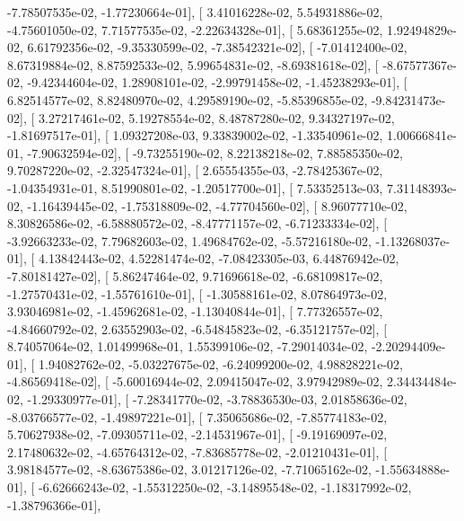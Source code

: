 \documentclass{article}
\begin{document}
         -7.78507535e-02,  -1.77230664e-01],
       [  3.41016228e-02,   5.54931886e-02,  -4.75601050e-02,
          7.71577535e-02,  -2.22634328e-01],
       [  5.68361255e-02,   1.92494829e-02,   6.61792356e-02,
         -9.35330599e-02,  -7.38542321e-02],
       [ -7.01412400e-02,   8.67319884e-02,   8.87592533e-02,
          5.99654831e-02,  -8.69381618e-02],
       [ -8.67577367e-02,  -9.42344604e-02,   1.28908101e-02,
         -2.99791458e-02,  -1.45238293e-01],
       [  6.82514577e-02,   8.82480970e-02,   4.29589190e-02,
         -5.85396855e-02,  -9.84231473e-02],
       [  3.27217461e-02,   5.19278554e-02,   8.48787280e-02,
          9.34327197e-02,  -1.81697517e-01],
       [  1.09327208e-03,   9.33839002e-02,  -1.33540961e-02,
          1.00666841e-01,  -7.90632594e-02],
       [ -9.73255190e-02,   8.22138218e-02,   7.88585350e-02,
          9.70287220e-02,  -2.32547324e-01],
       [  2.65554355e-03,  -2.78425367e-02,  -1.04354931e-01,
          8.51990801e-02,  -1.20517700e-01],
       [  7.53352513e-03,   7.31148393e-02,  -1.16439445e-02,
         -1.75318809e-02,  -4.77704560e-02],
       [  8.96077710e-02,   8.30826586e-02,  -6.58880572e-02,
         -8.47771157e-02,  -6.71233334e-02],
       [ -3.92663233e-02,   7.79682603e-02,   1.49684762e-02,
         -5.57216180e-02,  -1.13268037e-01],
       [  4.13842443e-02,   4.52281474e-02,  -7.08423305e-03,
          6.44876942e-02,  -7.80181427e-02],
       [  5.86247464e-02,   9.71696618e-02,  -6.68109817e-02,
         -1.27570431e-02,  -1.55761610e-01],
       [ -1.30588161e-02,   8.07864973e-02,   3.93046981e-02,
         -1.45962681e-02,  -1.13040844e-01],
       [  7.77326557e-02,  -4.84660792e-02,   2.63552903e-02,
         -6.54845823e-02,  -6.35121757e-02],
       [  8.74057064e-02,   1.01499968e-01,   1.55399106e-02,
         -7.29014034e-02,  -2.20294409e-01],
       [  1.94082762e-02,  -5.03227675e-02,  -6.24099200e-02,
          4.98828221e-02,  -4.86569418e-02],
       [ -5.60016944e-02,   2.09415047e-02,   3.97942989e-02,
          2.34434484e-02,  -1.29330977e-01],
       [ -7.28341770e-02,  -3.78836530e-03,   2.01858636e-02,
         -8.03766577e-02,  -1.49897221e-01],
       [  7.35065686e-02,  -7.85774183e-02,   5.70627938e-02,
         -7.09305711e-02,  -2.14531967e-01],
       [ -9.19169097e-02,   2.17480632e-02,  -4.65764312e-02,
         -7.83685778e-02,  -2.01210431e-01],
       [  3.98184577e-02,  -8.63675386e-02,   3.01217126e-02,
         -7.71065162e-02,  -1.55634888e-01],
       [ -6.62666243e-02,  -1.55312250e-02,  -3.14895548e-02,
         -1.18317992e-02,  -1.38796366e-01],
\end{document}

